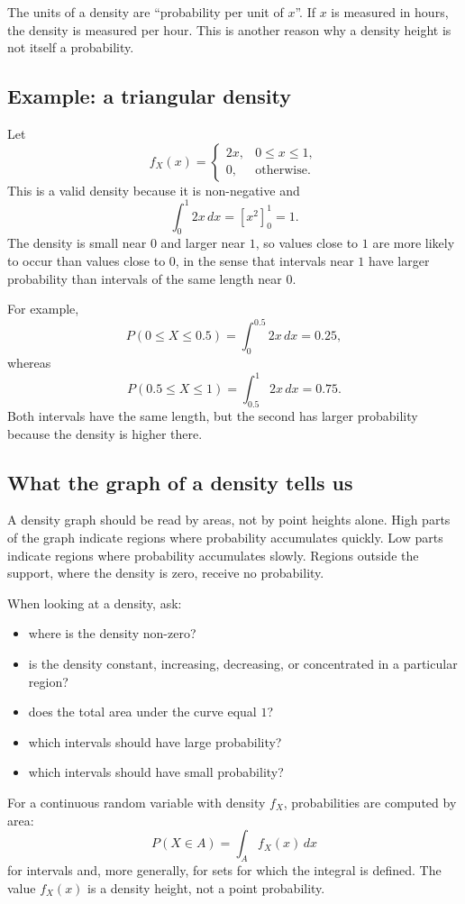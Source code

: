 \begin{remarkbox}
The units of a density are ``probability per unit of \(x\)''. If \(x\) is measured
in hours, the density is measured per hour. This is another reason why a density
height is not itself a probability.
\end{remarkbox}

\subsection*{Example: a triangular density}

Let
\[
f_X(x)=
\begin{cases}
2x, & 0\leq x\leq 1,\\
0, & \text{otherwise}.
\end{cases}
\]
This is a valid density because it is non-negative and
\[
\int_0^1 2x\,dx=\left[x^2\right]_0^1=1.
\]
The density is small near \(0\) and larger near \(1\), so values close to \(1\)
are more likely to occur than values close to \(0\), in the sense that intervals
near \(1\) have larger probability than intervals of the same length near \(0\).

For example,
\[
P(0\leq X\leq 0.5)=\int_0^{0.5}2x\,dx=0.25,
\]
whereas
\[
P(0.5\leq X\leq 1)=\int_{0.5}^{1}2x\,dx=0.75.
\]
Both intervals have the same length, but the second has larger probability
because the density is higher there.

\subsection*{What the graph of a density tells us}

A density graph should be read by areas, not by point heights alone. High parts
of the graph indicate regions where probability accumulates quickly. Low parts
indicate regions where probability accumulates slowly. Regions outside the
support, where the density is zero, receive no probability.

When looking at a density, ask:
\begin{itemize}
    \item where is the density non-zero?
    \item is the density constant, increasing, decreasing, or concentrated in a
    particular region?
    \item does the total area under the curve equal \(1\)?
    \item which intervals should have large probability?
    \item which intervals should have small probability?
\end{itemize}

\begin{theorembox}
For a continuous random variable with density \(f_X\), probabilities are computed
by area:
\[
P(X\in A)=\int_A f_X(x)\,dx
\]
for intervals and, more generally, for sets for which the integral is defined.
The value \(f_X(x)\) is a density height, not a point probability.
\end{theorembox}
